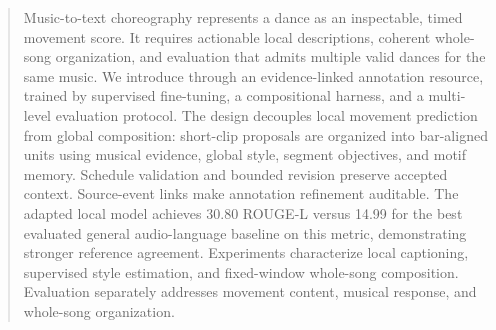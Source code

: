 \begin{abstract}
Music-to-text choreography represents a dance as an inspectable, timed
movement score. It requires actionable local descriptions, coherent
whole-song organization, and evaluation that admits multiple valid dances
for the same music. We introduce \method through an evidence-linked
annotation resource, \captioner trained by supervised fine-tuning,
a compositional harness, and a multi-level evaluation protocol. The
design decouples local movement prediction from global composition:
short-clip proposals are organized into bar-aligned units using musical
evidence, global style, segment objectives, and motif memory. Schedule
validation and bounded revision preserve accepted context. Source-event
links make annotation refinement auditable. The adapted local
model achieves 30.80 ROUGE-L versus 14.99 for the best evaluated general
audio-language baseline on this metric, demonstrating stronger reference
agreement. Experiments characterize local captioning, supervised style
estimation, and fixed-window whole-song composition. Evaluation separately
addresses movement content, musical response, and whole-song organization.
\end{abstract}
